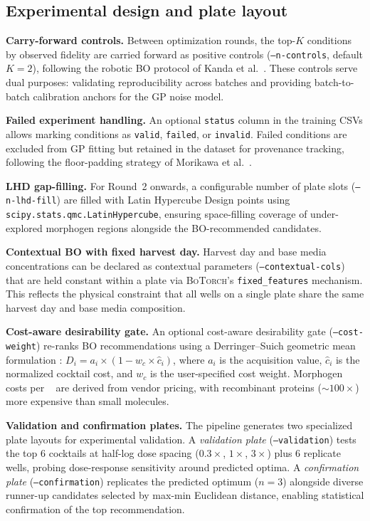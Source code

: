 \documentclass[times,twoside]{zHenriquesLab-StyleBioRxiv}
\newcommand{\botorch}{\textsc{BoTorch}}
\begin{document}
\subsection*{Experimental design and plate layout}

\textbf{Carry-forward controls.} Between optimization rounds, the top-$K$ conditions by observed fidelity are carried forward as positive controls (\texttt{--n-controls}, default $K{=}2$), following the robotic BO protocol of Kanda et al.\ \cite{Kanda2022}. These controls serve dual purposes: validating reproducibility across batches and providing batch-to-batch calibration anchors for the GP noise model.

\textbf{Failed experiment handling.} An optional \texttt{status} column in the training CSVs allows marking conditions as \texttt{valid}, \texttt{failed}, or \texttt{invalid}. Failed conditions are excluded from GP fitting but retained in the dataset for provenance tracking, following the floor-padding strategy of Morikawa et al.\ \cite{Morikawa2022}.

\textbf{LHD gap-filling.} For Round~2 onwards, a configurable number of plate slots (\texttt{--n-lhd-fill}) are filled with Latin Hypercube Design points using \texttt{scipy.stats.qmc.LatinHypercube}, ensuring space-filling coverage of under-explored morphogen regions alongside the BO-recommended candidates.

\textbf{Contextual BO with fixed harvest day.} Harvest day and base media concentrations can be declared as contextual parameters (\texttt{--contextual-cols}) that are held constant within a plate via \botorch{}'s \texttt{fixed\_features} mechanism. This reflects the physical constraint that all wells on a single plate share the same harvest day and base media composition.

\textbf{Cost-aware desirability gate.} An optional cost-aware desirability gate (\texttt{--cost-weight}) re-ranks BO recommendations using a Derringer--Suich geometric mean formulation \cite{DerringerSuich1980}: $D_i = a_i \times (1 - w_c \times \hat{c}_i)$, where $a_i$ is the acquisition value, $\hat{c}_i$ is the normalized cocktail cost, and $w_c$ is the user-specified cost weight. Morphogen costs per \si{\micro\Molar} are derived from vendor pricing, with recombinant proteins (${\sim}100{\times}$) more expensive than small molecules.

\textbf{Validation and confirmation plates.} The pipeline generates two specialized plate layouts for experimental validation. A \emph{validation plate} (\texttt{--validation}) tests the top 6 cocktails at half-log dose spacing ($0.3{\times}$, $1{\times}$, $3{\times}$) plus 6 replicate wells, probing dose-response sensitivity around predicted optima. A \emph{confirmation plate} (\texttt{--confirmation}) replicates the predicted optimum ($n{=}3$) alongside diverse runner-up candidates selected by max-min Euclidean distance, enabling statistical confirmation of the top recommendation.
\end{document}
